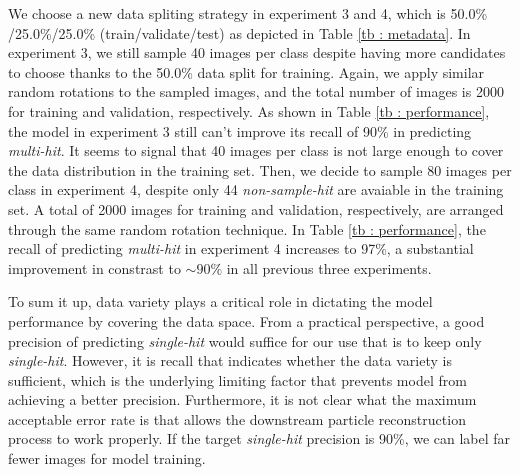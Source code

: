 We choose a new data spliting strategy in experiment 3 and 4, which is 50.0\%
/25.0\%/25.0\% (train/validate/test) as depicted in Table \ref{tb : metadata}.
In experiment 3, we still sample 40 images per class despite having more
candidates to choose thanks to the 50.0\% data split for training.  Again, we
apply similar random rotations to the sampled images, and the total number of
images is 2000 for training and validation, respectively.  As shown in Table
\ref{tb : performance}, the model in experiment 3 still can't improve its recall
of 90\% in predicting \textit{multi-hit}.  It seems to signal that 40 images per
class is not large enough to cover the data distribution in the training set.
Then, we decide to sample 80 images per class in experiment 4, despite only 44
\textit{non-sample-hit} are avaiable in the training set.  A total of 2000
images for training and validation, respectively, are arranged through the same
random rotation technique.  In Table \ref{tb : performance}, the recall of
predicting \textit{multi-hit} in experiment 4 increases to 97\%, a substantial
improvement in constrast to $\sim 90\%$ in all previous three experiments.  

To sum it up, data variety plays a critical role in dictating the model
performance by covering the data space.  From a practical perspective, a good
precision of predicting \textit{single-hit} would suffice for our use that is to
keep only \textit{single-hit}.  However, it is recall that indicates whether the
data variety is sufficient, which is the underlying limiting factor that
prevents model from achieving a better precision.  Furthermore, it is not clear
what the maximum acceptable error rate is that allows the downstream particle
reconstruction process to work properly.  If the target \textit{single-hit}
precision is 90\%, we can label far fewer images for model training.  





